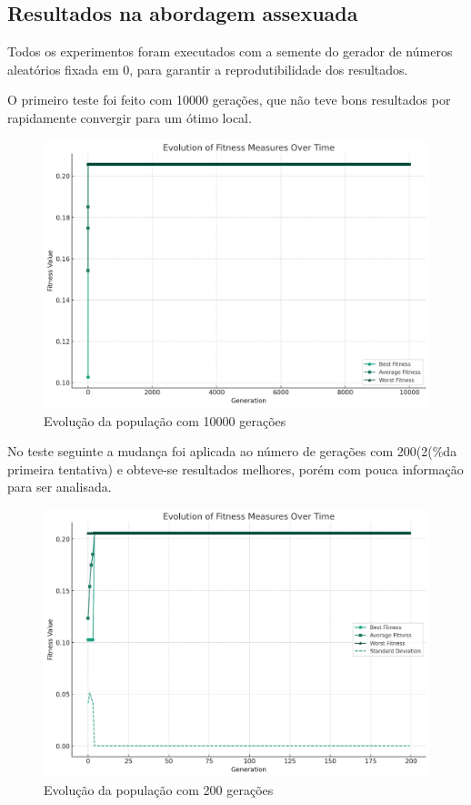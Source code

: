 \documentclass[12pt]{article}
\begin{document}
\subsection{Resultados na abordagem assexuada}
Todos os experimentos foram executados com a semente do gerador de números aleatórios fixada em 0, para garantir a reprodutibilidade dos resultados.

O primeiro teste foi feito com 10000 gerações, que não teve bons resultados por rapidamente convergir para um ótimo local.

\begin{figure}[h]
    \centering
    \includegraphics[width=0.5\linewidth]{1tentativa.png}
    \caption{Evolução da população com 10000 gerações}
    \label{fig:first-attempt}
\end{figure}

No teste seguinte a mudança  foi aplicada ao número de gerações com 200(2(\%da primeira tentativa) e obteve-se resultados melhores, porém com pouca informação para ser analisada.

\begin{figure}[h]
    \centering
    \includegraphics[width=0.5\linewidth]{2tentativa.png}
    \caption{Evolução da população com 200 gerações}
    \label{fig: second-attempt}
\end{figure}
\end{document}

